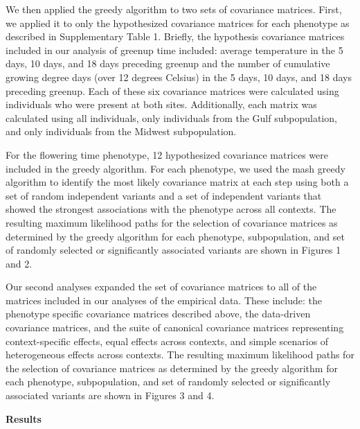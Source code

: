 \documentclass[
  letterpaper,
  DIV=11,
  numbers=noendperiod]{scrartcl}
\begin{document}
We then applied the greedy algorithm to two sets of covariance matrices.
First, we applied it to only the hypothesized covariance matrices for
each phenotype as described in Supplementary Table 1. Briefly, the
hypothesis covariance matrices included in our analysis of greenup time
included: average temperature in the 5 days, 10 days, and 18 days
preceding greenup and the number of cumulative growing degree days (over
12 degrees Celsius) in the 5 days, 10 days, and 18 days preceding
greenup. Each of these six covariance matrices were calculated using
individuals who were present at both sites. Additionally, each matrix
was calculated using all individuals, only individuals from the Gulf
subpopulation, and only individuals from the Midwest subpopulation.

\hfill\break

For the flowering time phenotype, 12 hypothesized covariance matrices
were included in the greedy algorithm. For each phenotype, we used the
mash greedy algorithm to identify the most likely covariance matrix at
each step using both a set of random independent variants and a set of
independent variants that showed the strongest associations with the
phenotype across all contexts. The resulting maximum likelihood paths
for the selection of covariance matrices as determined by the greedy
algorithm for each phenotype, subpopulation, and set of randomly
selected or significantly associated variants are shown in Figures 1 and
2.~

\hfill\break

Our second analyses expanded the set of covariance matrices to all of
the matrices included in our analyses of the empirical data. These
include: the phenotype specific covariance matrices described above, the
data-driven covariance matrices, and the suite of canonical covariance
matrices representing context-specific effects, equal effects across
contexts, and simple scenarios of heterogeneous effects across contexts.
The resulting maximum likelihood paths for the selection of covariance
matrices as determined by the greedy algorithm for each phenotype,
subpopulation, and set of randomly selected or significantly associated
variants are shown in Figures 3 and 4.~

\hfill\break

\textbf{Results}
\end{document}
